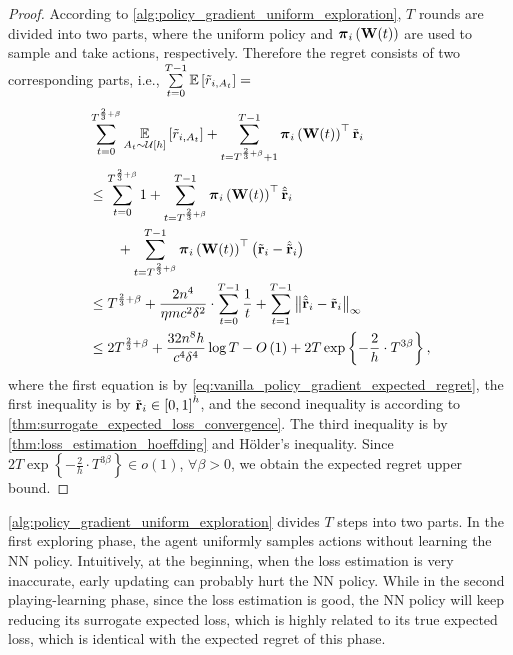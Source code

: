 \begin{proof}
According to \cref{alg:policy_gradient_uniform_exploration}, $T$ rounds are divided into two parts, where the uniform policy and ${\boldsymbol{\pi}}_i\left( {\mathbf{W}}(t) \right)$ are used to sample and take actions, respectively. Therefore the regret consists of two corresponding parts, i.e., $\sum\limits_{t=0}^{T-1}{ {\mathbb{E}} \left[ \tilde{r}_{i, A_t} \right] } =$
\begin{equation*}
\begin{split}
     &\sum\limits_{t=0}^{T^{\frac{2}{3} + \beta}}{ \operatorname*{{\mathbb{E}}}\limits_{A_t \sim {\mathcal{U}}\left[h\right]}{ \left[ \tilde{r}_{i, A_t} \right] }} + \sum\limits_{t=T^{\frac{2}{3} + \beta} + 1}^{T-1}{ {\boldsymbol{\pi}}_i\left( {\mathbf{W}}(t) \right)^\top {\tilde{\mathbf{r}}}_i } \\
     &\le \sum\limits_{t=0}^{T^{\frac{2}{3} + \beta}}{ 1 } + \sum\limits_{t=T^{\frac{2}{3} + \beta}}^{T-1}{ {\boldsymbol{\pi}}_i\left( {\mathbf{W}}(t) \right)^\top \hat{{\tilde{\mathbf{r}}}}_i } \\
     &\qquad + \sum\limits_{t=T^{\frac{2}{3} + \beta}}^{T-1}{ {\boldsymbol{\pi}}_i\left( {\mathbf{W}}(t) \right)^\top \left( {\tilde{\mathbf{r}}}_i -  \hat{{\tilde{\mathbf{r}}}}_i \right) }  \\
     &\le T^{\frac{2}{3} + \beta } + \frac{2n^4}{\eta m c^2 \delta^2} \cdot \sum\limits_{t=0}^{T-1}{ \frac{1}{t} } +  \sum\limits_{t=1}^{T-1}{ \left\| \hat{{\tilde{\mathbf{r}}}}_i - {\tilde{\mathbf{r}}}_i \right\|_\infty } \\
     &\le 2 T^{\frac{2}{3} + \beta } + \frac{32n^8h}{ c^4 \delta^4}\log{T} -O\left(1 \right) + 2 T \exp\left\{ - \frac{2}{h} \cdot  T^{3\beta} \right\},
\end{split}
\end{equation*}
where the first equation is by \cref{eq:vanilla_policy_gradient_expected_regret}, the first inequality is by ${\tilde{\mathbf{r}}}_i \in \left[ 0, 1\right]^h$, and the second inequality is according to \cref{thm:surrogate_expected_loss_convergence}. The third inequality is by \cref{thm:loss_estimation_hoeffding} and H{\"o}lder's inequality. Since $2 T \exp\left\{ - \frac{2}{h} \cdot  T^{3\beta} \right\} \in o(1)$, $\forall \beta > 0$, we obtain the expected regret upper bound.
\end{proof}

\cref{alg:policy_gradient_uniform_exploration} divides $T$ steps into two parts. In the first exploring phase, the agent uniformly samples actions without learning the NN policy. Intuitively, at the beginning, when the loss estimation is very inaccurate, early updating can probably hurt the NN policy.  While in the second playing-learning phase, since the loss estimation is good, the NN policy will keep reducing its surrogate expected loss, which is highly related to its true expected loss, which is identical with the expected regret of this phase.

